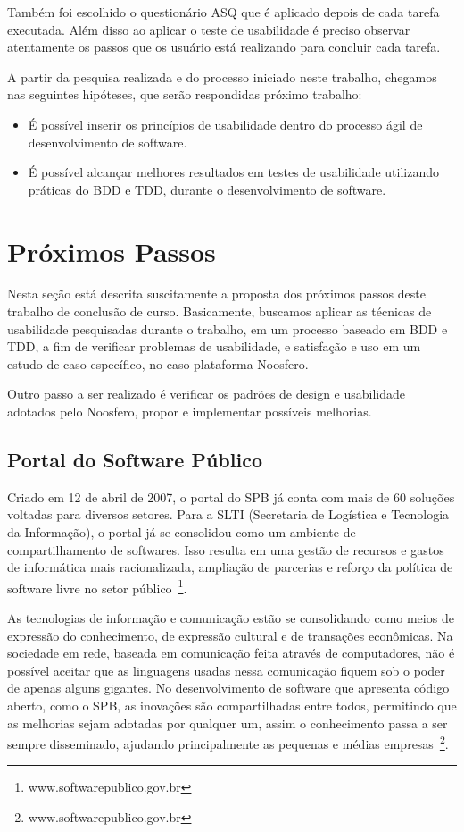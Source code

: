 	Também foi escolhido o questionário ASQ que é aplicado depois de cada tarefa executada. Além disso ao aplicar o teste de usabilidade é preciso observar atentamente os passos que os usuário está realizando para concluir cada tarefa.


A partir da pesquisa realizada e do processo iniciado neste trabalho, chegamos nas seguintes hipóteses, que serão respondidas próximo trabalho: 
\begin{itemize}
\item É possível inserir os princípios de usabilidade dentro do processo ágil de desenvolvimento de software.
\item É possível alcançar melhores resultados em testes de usabilidade utilizando práticas do BDD e TDD, durante o desenvolvimento de software.
\end{itemize}

\section{Próximos Passos}

Nesta seção está descrita suscitamente a proposta dos próximos passos deste trabalho de conclusão de curso. Basicamente, buscamos aplicar as técnicas de usabilidade pesquisadas durante o trabalho, em um processo baseado em BDD e TDD, a fim de verificar problemas de usabilidade, e satisfação e uso em um estudo de caso específico, no caso plataforma Noosfero. 

Outro passo a ser realizado é verificar os padrões de design e usabilidade adotados pelo Noosfero, propor  e implementar possíveis melhorias.

\subsection{Portal do Software Público}

Criado em 12 de abril de 2007, o portal do SPB já conta com mais de 60 soluções voltadas para diversos setores. Para a SLTI (Secretaria de Logística e Tecnologia da Informação), o portal já se consolidou como um ambiente de compartilhamento de softwares. Isso resulta em uma gestão de recursos e gastos de informática mais racionalizada, ampliação de parcerias e reforço da política de software livre no setor público~\footnote{www.softwarepublico.gov.br}. 

As tecnologias de informação e comunicação estão se consolidando como meios de expressão do conhecimento, de expressão cultural e de transações econômicas. Na sociedade em rede, baseada em comunicação feita através de computadores, não é possível aceitar que as linguagens usadas nessa comunicação fiquem sob o poder de apenas alguns gigantes. No desenvolvimento de software que apresenta código aberto, como o SPB, as inovações são compartilhadas entre todos, permitindo que as melhorias sejam adotadas por qualquer um, assim o conhecimento passa a ser sempre disseminado, ajudando principalmente as pequenas e médias empresas~\footnote{www.softwarepublico.gov.br}.

